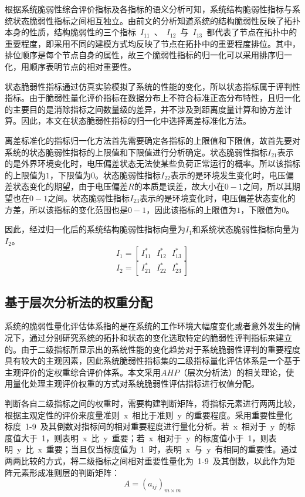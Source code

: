 根据系统脆弱性综合评价指标及各指标的语义分析可知，系统结构脆弱性指标与系统状态脆弱性指标之间相互独立。由前文的分析知道系统的结构脆弱性反映了拓扑本身的性质，结构脆弱性的三个指标~$I_{11}$~、~$I_{12}$~与~$I_{13}$~都代表了节点在拓扑中的重要程度，即采用不同的建模方式均反映了节点在拓扑中的重要程度排位。其中，排位顺序是每个节点自身的属性，故三个脆弱性指标的归一化可以采用排序归一化，用顺序表明节点的相对重要性。

状态脆弱性指标通过仿真实验模拟了系统的性能的变化，所以状态指标属于评判性指标。由于脆弱性量化评价指标在数据分布上不符合标准正态分布特性，且归一化的主要目的是消除指标之间数量级的差异，并不涉及到距离度量计算和协方差计算。因此，本文在状态脆弱性指标的归一化中选择离差标准化方法。

离差标准化的指标归一化方法首先需要确定各指标的上限值和下限值，故首先要对系统的状态脆弱性指标的上限值和下限值进行分析确定。状态脆弱性指标$I_{21}$表示的是外界环境变化时，电压偏差状态无法使某些负荷正常运行的概率。所以该指标的上限值为$1$，下限值为$0$。状态脆弱性指标$I_{22}$表示的是环境发生变化时，电压偏差状态变化的期望，由于电压偏差$R$的本质是误差，故大小在$0-1$之间，所以其期望也在$ 0-1$之间。状态脆弱性指标$I_{23}$表示的是环境变化时，电压偏差状态变化的方差，所以该指标的变化范围也是$0-1$，因此该指标的上限值为$1$，下限值为$0$。

因此，经过归一化后的系统结构脆弱性指标向量为$I_{1}$和系统状态脆弱性指标向量为$I_{2}$。
\begin{equation}
\label{equ:chap4:Index5}
I_{1}=\left[~I_{11}^{\ast}~~~I_{12}^{\ast}~~~I_{13}^{\ast}~\right]
\end{equation}
\begin{equation}
\label{equ:chap4:Index6}
I_{2}=\left[~I_{21}^{\ast}~~~I_{22}^{\ast}~~~I_{23}^{\ast}~\right]
\end{equation}

\subsection{基于层次分析法的权重分配}
\label{sec:nomalz}
系统的脆弱性量化评估体系指的是在系统的工作环境大幅度变化或者意外发生的情况下，通过分别研究系统的拓扑和状态的变化选取特定的脆弱性评判指标来建立的。由于二级指标所显示出的系统性能的变化趋势对于系统脆弱性评判的重要程度具有较大的主观因素，因此系统脆弱性指标集的二级指标量化评估体系是一个基于主观评价的定权重综合评价体系。本文采用$AHP$（层次分析法）的相关理论，使用量化处理主观评价权重的方式对系统脆弱性评估指标进行权值分配。

判断各自二级指标之间的权重时，需要构建判断矩阵，将指标元素进行两两比较，根据主观定性的评价来度量准则~x~相比于准则~y~的重要程度。采用重要性量化标度~1-9~及其倒数对指标间的相对重要程度进行量化分析。若~x~相对于~y~的标度值大于~1，则表明~x~比~y~重要；若~x~相对于~y~的标度值小于~1，则表明~y~比~x~重要；当且仅当标度值为~1~时，表明~x~与~y~有相同的重要性。通过两两比较的方式，将二级指标之间相对重要性量化为~1-9~及其倒数，以此作为矩阵元素形成准则层的判断矩阵：
\begin{equation}\label{equ:chap4:Index8}
    A=\left(a_{ij}\right)_{m\times m}
\end{equation}

